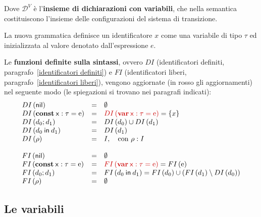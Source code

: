 \documentclass[a4paper]{article}
\begin{document}
	\noindent
	Dove $\mathcal{D}^{V}$ è l'\textbf{insieme di dichiarazioni con variabili}, che nella semantica costituiscono l'insieme delle configurazioni del sistema di transizione.
	
	La nuova grammatica definisce un identificatore $x$ come una variabile di tipo $\tau$ ed inizializzata al valore denotato dall'espressione $e$.\newline
	
	\noindent
	Le \textbf{funzioni definite sulla sintassi}, ovvero $DI$ (identificatori definiti, paragrafo~\ref{identificatori definiti}) e $FI$ (identificatori liberi, paragrafo~\ref{identificatori liberi}), vengono aggiornate (in rosso gli aggiornamenti) nel seguente modo (le spiegazioni si trovano nei paragrafi indicati):
	\begin{equation*}
		\begin{array}{lll}
			DI\left(\mathsf{nil}\right) & = & \emptyset \\
			DI\left(\mathbf{const} \: \mathsf{x}: \tau = \mathrm{e}\right) & = & \textcolor{Red3}{DI\left(\mathbf{var} \: \mathsf{x}: \tau = \mathrm{e}\right)} = \left\{x\right\} \\
			DI\left(d_{0} ; d_{1}\right) & = & DI\left(d_{0}\right) \cup DI\left(d_{1}\right) \\
			DI\left(d_{0} \: \mathsf{in} \: d_{1}\right) & = & DI\left(d_{1}\right) \\
			DI\left(\rho\right) & = & I, \hspace{1em} \text{con } \rho : I \\
			\\
			FI\left(\mathsf{nil}\right) & = & \emptyset \\
			FI\left(\mathbf{const} \: \mathsf{x}: \tau = \mathrm{e}\right) & = & \textcolor{Red3}{FI\left(\mathbf{var} \: \mathsf{x}: \tau = \mathrm{e}\right)} = FI\left(\mathrm{e}\right) \\
			FI\left(d_{0} ; d_{1}\right) & = & FI\left(d_{0} \: \mathsf{in} \: d_{1}\right) = FI\left(d_{0}\right) \cup \left(FI\left(d_{1}\right) \setminus DI\left(d_{0}\right)\right) \\
			FI\left(\rho\right) & = & \emptyset
		\end{array}
	\end{equation*}\newpage

	\subsection{Le variabili}
	
\end{document}
